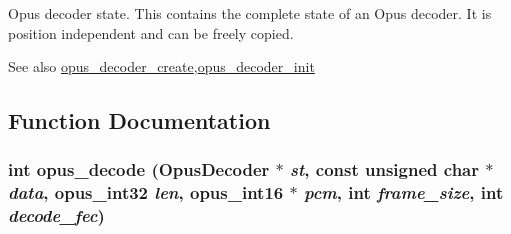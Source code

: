 Opus decoder state. This contains the complete state of an Opus decoder. It is position independent and can be freely copied. \begin{DoxySeeAlso}{See also}
\hyperlink{group__opus__decoder_ga753f6fe0b699c81cfd47d70c8e15a0bd}{opus\_\-decoder\_\-create},\hyperlink{group__opus__decoder_ga939156d1f561c4273d5c62fa9c235a01}{opus\_\-decoder\_\-init} 
\end{DoxySeeAlso}


\subsection{Function Documentation}
\hypertarget{group__opus__decoder_ga7d1111f64c36027ddcb81799df9b3fc9}{
\subsubsection[{opus\_\-decode}]{\setlength{\rightskip}{0pt plus 5cm}int opus\_\-decode ({\bf OpusDecoder} $\ast$ {\em st}, \/  const unsigned char $\ast$ {\em data}, \/  {\bf opus\_\-int32} {\em len}, \/  {\bf opus\_\-int16} $\ast$ {\em pcm}, \/  int {\em frame\_\-size}, \/  int {\em decode\_\-fec})}}
\label{group__opus__decoder_ga7d1111f64c36027ddcb81799df9b3fc9}


